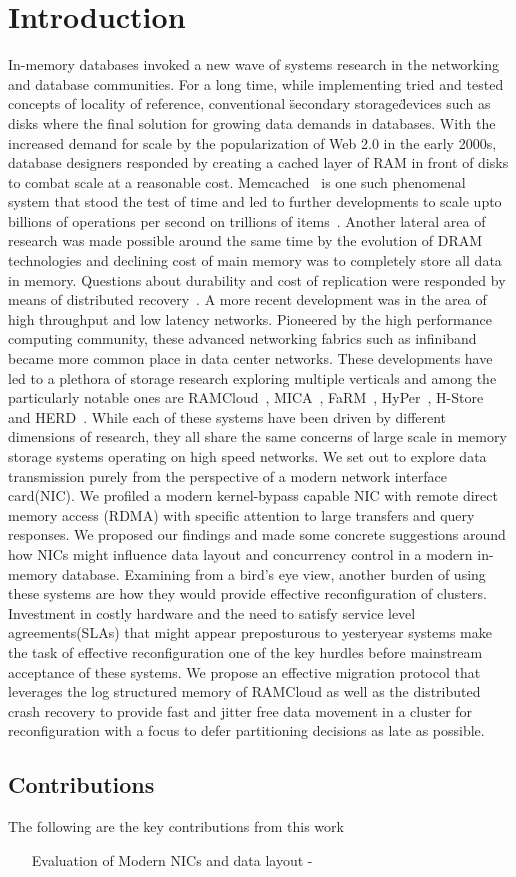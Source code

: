 
\chapter{Introduction}
In-memory databases invoked a new wave of systems research in the 
networking and database communities. For a long time, while implementing tried
and tested concepts of locality of reference, conventional \"secondary storage\" devices
such as disks where the final solution for growing data demands in databases. With the 
increased demand for scale by the popularization of Web 2.0 in the early 2000s, 
database designers responded by creating a cached layer of RAM in front of disks
to combat scale at a reasonable cost. Memcached~\cite{memcached-orig}
is one such phenomenal system that stood the test of time and led to further developments
to scale upto billions of operations per second on trillions of items~\cite{nishtala2013scaling}.
Another lateral area of research was made possible around the same time by the 
evolution of DRAM technologies and declining cost of main memory was to completely
store all data in memory. Questions about durability and cost of replication 
were responded by means of distributed recovery~\cite{ongaro2011fast}. 
A more recent development was in the area of high throughput and low latency networks. 
Pioneered by the high performance computing community, these advanced networking fabrics 
such as infiniband~\cite{pfister2001introduction} became more common place in 
data center networks. These developments have led to a plethora of storage research 
exploring multiple verticals and among the particularly notable ones are RAMCloud~\cite{ramcloud},
MICA~\cite{mica}, FaRM~\cite{farm}, HyPer~\cite{hyper}, H-Store~\cite{hstore} 
and HERD~\cite{herd}. While each of these systems have been driven by different dimensions 
of research, they all share the same concerns of large scale in memory storage systems 
operating on high speed networks. We set out to explore data transmission purely from the
perspective of a modern network interface card(NIC). We profiled a modern kernel-bypass capable NIC 
with remote direct memory access (RDMA) with specific attention to large transfers
and query responses. We proposed our findings and made some concrete suggestions 
around how NICs might influence data layout and concurrency control in a modern 
in-memory database. Examining from a bird's eye view, another burden of using these 
systems are how they would provide effective reconfiguration of clusters. Investment
in costly hardware and the need to satisfy service level agreements(SLAs) that might 
appear preposturous to yesteryear systems make the task of effective reconfiguration 
one of the key hurdles before mainstream acceptance of these systems. We propose an 
effective migration protocol that leverages the log structured memory of RAMCloud as 
well as the distributed crash recovery to provide fast and jitter free data movement 
in a cluster for reconfiguration with a focus to defer partitioning decisions as late 
as possible.


\section{Contributions}

The following are the key contributions from this work
\begin{itemize}
\item[Evaluation of Modern NICs and data layout] -
\end{itemize}

